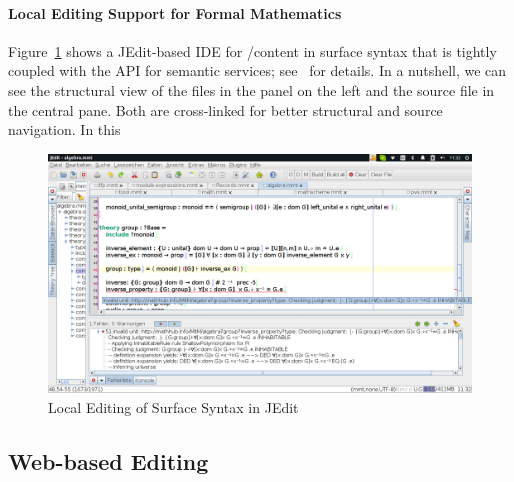 \paragraph{Local Editing Support for Formal Mathematics}

Figure~\ref{fig:jedit2} shows a JEdit-based IDE for \omdoc/\mmt content in \mmt surface
syntax that is tightly coupled with the \mmt API for semantic services;
see~\cite{Rabe:LII14} for details. In a nutshell, we can see the structural view of the
files in the panel on the left and the source file in the central pane. Both are
cross-linked for better structural and source navigation. In this 

\begin{figure}[ht]\centering
  \includegraphics[width=15cm]{jedit2}
  \caption{Local Editing of \mmt Surface Syntax in JEdit}\label{fig:jedit2}
\end{figure}

\subsection{Web-based \sys Editing}\label{sec:web}


